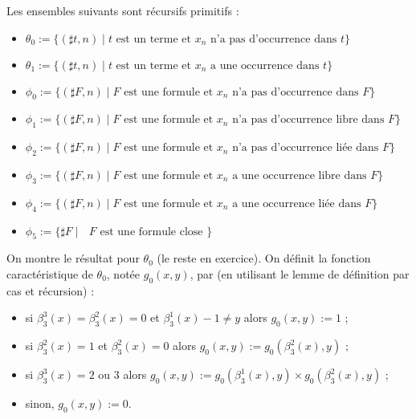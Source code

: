\documentclass[./main]{subfiles}
\begin{document}
 \begin{lem}
   Les ensembles suivants sont récursifs primitifs :
   \footnotesize
   \begin{itemize}
     \item $\theta_0 := \{(\sharp t, n)  \mid \text{$t$ est un terme et $x_n$ n'a pas d'occurrence dans $t$}\}$
     \item $\theta_1 := \{(\sharp t, n)  \mid \text{$t$ est un terme et $x_n$ a une occurrence dans $t$}\}$
     \item $\phi_0 := \{(\sharp F, n)  \mid \text{$F$ est une formule et $x_n$ n'a pas d'occurrence dans $F$}\} $
     \item $\phi_1 := \{(\sharp F, n)  \mid \text{$F$ est une formule et $x_n$ n'a pas d'occurrence libre dans $F$}\} $
     \item $\phi_2 := \{(\sharp F, n)  \mid \text{$F$ est une formule et $x_n$ n'a pas d'occurrence liée dans $F$}\} $
     \item $\phi_3 := \{(\sharp F, n)  \mid \text{$F$ est une formule et $x_n$ a une occurrence libre dans $F$}\} $
     \item $\phi_4 := \{(\sharp F, n)  \mid \text{$F$ est une formule et $x_n$ a une occurrence liée dans $F$}\} $
     \item $\phi_5 := \{\sharp F  \mid \text{ $F$ est une formule close }\} $
   \end{itemize}
 \end{lem}
 \begin{prv}
   On montre le résultat pour $\theta_0$ (le reste en exercice).
   On définit la fonction caractéristique de $\theta_0$, notée  $g_0(x, y)$, par (en utilisant le lemme de définition par cas et récursion) :
    \begin{itemize}
     \item si $\beta_3^3(x) = \beta_3^2(x) = 0$ et  $\beta_3^1(x) - 1 \neq y$ alors $g_0(x, y) := 1$ ;
     \item si $\beta_3^2(x) = 1$ et $\beta_3^2(x) = 0$ alors  $g_0(x,y) := g_0(\beta_3^2(x), y)$ ;
     \item si  $\beta_3^3(x) = 2\text{ ou } 3$ alors $g_0(x,y) := g_0(\beta_3^1(x), y) \times g_0(\beta_3^2(x), y)$ ;
     \item sinon, $g_0(x,y) := 0$.
   \end{itemize}
 \end{prv}
\end{document}

